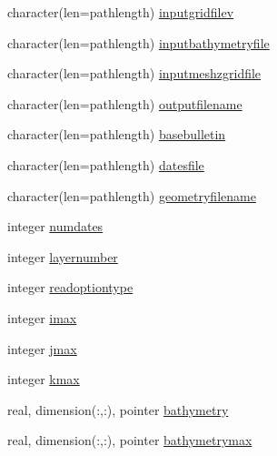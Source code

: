 \begin{DoxyCompactItemize}
\item 
character(len=pathlength) \mbox{\hyperlink{structmodulemercatorformat_1_1t__mercatorformat_af3222f4ac3c4c8c144e9b12dc00a27eb}{inputgridfilev}}
\item 
character(len=pathlength) \mbox{\hyperlink{structmodulemercatorformat_1_1t__mercatorformat_a7d947c03b6ed0e28f5cc95cb228425b8}{inputbathymetryfile}}
\item 
character(len=pathlength) \mbox{\hyperlink{structmodulemercatorformat_1_1t__mercatorformat_a8695a2a2da4e16dd5c5436ba08dea157}{inputmeshzgridfile}}
\item 
character(len=pathlength) \mbox{\hyperlink{structmodulemercatorformat_1_1t__mercatorformat_a93a8624e0ae671cb5d4ceef0dab7e3d6}{outputfilename}}
\item 
character(len=pathlength) \mbox{\hyperlink{structmodulemercatorformat_1_1t__mercatorformat_a9224982509fb9b44214d70322a331154}{basebulletin}}
\item 
character(len=pathlength) \mbox{\hyperlink{structmodulemercatorformat_1_1t__mercatorformat_a944b2bae8253c23aa30daf49d402eeaf}{datesfile}}
\item 
character(len=pathlength) \mbox{\hyperlink{structmodulemercatorformat_1_1t__mercatorformat_ac7dc05a6c9e0cc5ebde8f1398c589fa3}{geometryfilename}}
\item 
integer \mbox{\hyperlink{structmodulemercatorformat_1_1t__mercatorformat_a6de5a9ab9e702db0d6f0714a02918b6b}{numdates}}
\item 
integer \mbox{\hyperlink{structmodulemercatorformat_1_1t__mercatorformat_a47594b51955c6f41fe0ecf2aa021c0ae}{layernumber}}
\item 
integer \mbox{\hyperlink{structmodulemercatorformat_1_1t__mercatorformat_aacc5ead84d808e479e046db7992a9406}{readoptiontype}}
\item 
integer \mbox{\hyperlink{structmodulemercatorformat_1_1t__mercatorformat_ac6aa3f0ff63f09754615463c9be8d730}{imax}}
\item 
integer \mbox{\hyperlink{structmodulemercatorformat_1_1t__mercatorformat_a8ebc7fb74c172b02e2f780fb6d4b64d1}{jmax}}
\item 
integer \mbox{\hyperlink{structmodulemercatorformat_1_1t__mercatorformat_a29962de935c791e793e559a77532d4a2}{kmax}}
\item 
real, dimension(\+:,\+:), pointer \mbox{\hyperlink{structmodulemercatorformat_1_1t__mercatorformat_a8f05795cdf2d312283dec618b1f4afd1}{bathymetry}}
\item 
real, dimension(\+:,\+:), pointer \mbox{\hyperlink{structmodulemercatorformat_1_1t__mercatorformat_a1cb18bfbd09eb91bbd4c8893c263969d}{bathymetrymax}}

\end{DoxyCompactItemize}
